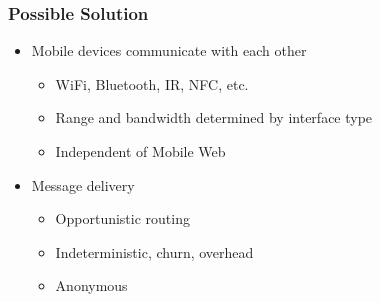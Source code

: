 \begin{frame}
  \frametitle{Possible Solution}
  \begin{itemize}
    \item Mobile devices communicate with each other
    \vspace{0.3cm}
    \begin{itemize}
      \item WiFi, Bluetooth, IR, NFC, etc.
      \vspace{0.1cm}
      \item Range and bandwidth determined by interface type
      \vspace{0.1cm}
      \item Independent of Mobile Web
    \end{itemize}

    \vspace{0.3cm}

    \item Message delivery
    \vspace{0.3cm}
    \begin{itemize}
      \item Opportunistic routing
      \vspace{0.1cm}
      \item Indeterministic, churn, overhead
      \vspace{0.1cm}
      \item Anonymous
    \end{itemize}
  \end{itemize}



\end{frame}


